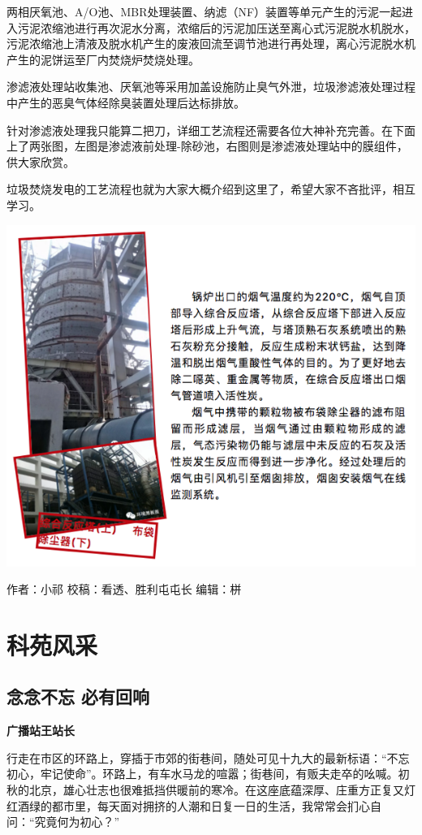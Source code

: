 \documentclass[]{book}
\begin{document}
两相厌氧池、A/O池、MBR处理装置、纳滤（NF）装置等单元产生的污泥一起进入污泥浓缩池进行再次泥水分离，浓缩后的污泥加压送至离心式污泥脱水机脱水，污泥浓缩池上清液及脱水机产生的废液回流至调节池进行再处理，离心污泥脱水机产生的泥饼运至厂内焚烧炉焚烧处理。

渗滤液处理站收集池、厌氧池等采用加盖设施防止臭气外泄，垃圾渗滤液处理过程中产生的恶臭气体经除臭装置处理后达标排放。

针对渗滤液处理我只能算二把刀，详细工艺流程还需要各位大神补充完善。在下面上了两张图，左图是渗滤液前处理-除砂池，右图则是渗滤液处理站中的膜组件，供大家欣赏。

垃圾焚烧发电的工艺流程也就为大家大概介绍到这里了，希望大家不吝批评，相互学习。

\includegraphics[width=8.33in]{images/ljfs7}

作者：小祁 校稿：看透、胜利屯屯长 编辑：栟

\chapter{科苑风采}

\section{念念不忘 必有回响}\label{-}

\textbf{广播站王站长}

行走在市区的环路上，穿插于市郊的街巷间，随处可见十九大的最新标语：``不忘初心，牢记使命''。环路上，有车水马龙的喧嚣；街巷间，有贩夫走卒的吆喊。初秋的北京，雄心壮志也很难抵挡供暖前的寒冷。在这座底蕴深厚、庄重方正复又灯红酒绿的都市里，每天面对拥挤的人潮和日复一日的生活，我常常会扪心自问：``究竟何为初心？''
\end{document}
